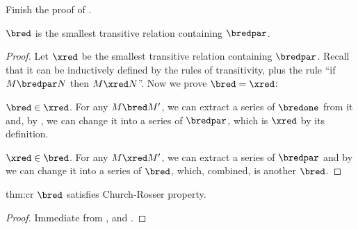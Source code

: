 \documentclass[../../../include/open-logic-section]{subfiles}
\begin{document}
\begin{prob}
  Finish the proof of .
\end{prob}

\begin{lem}
  $\bred$ is the smallest transitive relation containing $\bredpar$.
\end{lem}
\begin{proof}
  Let $\xred$ be the smallest transitive relation containing $\bredpar$.
  Recall that it can be inductively defined by the rules of transitivity, plus the rule ``if
  $M \bredpar N$ then $M \xred N$''. Now we prove $\bred = \xred$:
  
  $\bred \in \xred$. For any $M \bred M'$, we can extract a series of
  $\bredone$ from it and, by , we can change it
  into a series of $\bredpar$, which is $\xred$ by its definition.

  $\xred \in \bred$. For any $M \xred M'$, we can extract a series of
  $\bredpar$ and by  we can change it into a series
  of $\bred$, which, combined, is another $\bred$.
\end{proof}

\begin{thm}{thm:cr}
  $\bred$ satisfies Church-Rosser property.
\end{thm}
\begin{proof}
  Immediate from ,  and .
\end{proof}
\end{document}
